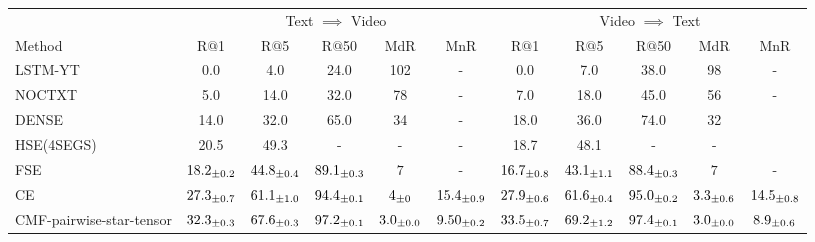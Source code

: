 \begin{table*}[h]
\centering 
\footnotesize 
\setlength{\tabcolsep}{5pt}
\begin{tabular}{l | c c c c c | c c c c c} 
\hline \hline 
\multicolumn{1}{c}{} & 
\multicolumn{5}{c}{Text $\implies$ Video} & \multicolumn{5}{c}{Video $\implies$ Text} \\
Method & R$@$1 & R$@$5 & R$@$50 & MdR & MnR & R$@$1 & R$@$5 & R$@$50 & MdR & MnR \\ 
\hline 
LSTM-YT & 0.0 & 4.0 & 24.0 & 102 & - & 0.0 & 7.0 & 38.0  & 98 & - \\
NOCTXT & 5.0 & 14.0 & 32.0 & 78 & - & 7.0 & 18.0 & 45.0 & 56 & - \\

DENSE & 14.0 & 32.0 & 65.0 & 34 & - & 18.0 & 36.0 & 74.0 & 32 \\
HSE(4SEGS) & 20.5 & 49.3 & - & - & - & 18.7 & 48.1 & - & - \\
FSE & $ 18.2_{\pm0.2}$ & $ 44.8_{\pm0.4}$ & $ {89.1}_{\pm 0.3}$ & $7$ & - & $ {16.7}_{\pm0.8}$ & $ {43.1}_{\pm1.1}$ & $ 88.4_{\pm0.3}$ & $7$ &  - \\
CE & $ 27.3_{\pm0.7}$ & $ 61.1_{\pm1.0}$ & $ 94.4_{\pm0.1}$ & $ 4_{\pm0}$ & $ 15.4_{\pm0.9}$ 
& $ 27.9_{\pm0.6}$ & $ 61.6_{\pm0.4}$ & $ 95.0_{\pm0.2}$ & $ 3.3_{\pm0.6}$ & $ 14.5_{\pm0.8}$ \\
\hline
CMF-pairwise-star-tensor & $ 32.3_{\pm0.3}$ & $ 67.6_{\pm0.3}$ & $ 97.2_{\pm0.1}$ & $ 3.0_{\pm0.0}$ & $ 9.50_{\pm0.2}$ & $ 33.5_{\pm0.7}$ & $ 69.2_{\pm1.2}$ & $ 97.4_{\pm0.1}$ & $ 3.0_{\pm0.0}$ & $ 8.9_{\pm0.6}$ \\

\end{tabular}
\end{table*}
